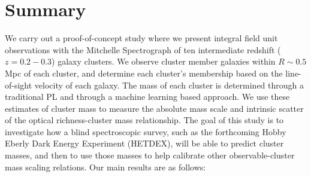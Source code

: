 \section{Summary}\label{2sec:summary}
We carry out a proof-of-concept study where we present integral field unit observations with the Mitchelle Spectrograph of ten intermediate redshift ($z=0.2-0.3$) galaxy clusters. We observe cluster member galaxies within $R\sim0.5$ Mpc of each cluster, and determine each cluster's membership based on the line-of-sight velocity of each galaxy. The mass of each cluster is determined through a traditional PL and through a machine learning based approach. We use these estimates of cluster mass to measure the absolute mass scale and intrinsic scatter of the optical richness-cluster mass relationship. The goal of this study is to investigate how a blind spectroscopic survey, such as the forthcoming Hobby Eberly Dark Energy Experiment (HETDEX), will be able to predict cluster masses, and then to use those masses to help calibrate other observable-cluster mass scaling relations.
Our main results are as follows:
